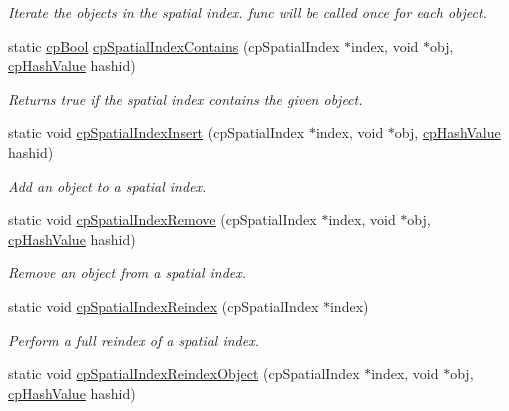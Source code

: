 \begin{DoxyCompactItemize}
\begin{DoxyCompactList}\small\item\em Iterate the objects in the spatial index. {\ttfamily func} will be called once for each object. \end{DoxyCompactList}\item 
static \hyperlink{group__basic_types_gabc5e752c48f3449ca26ef413ecbd647e}{cp\+Bool} \hyperlink{group__cp_spatial_index_gabe87290682030b3de790eb99d515cc37}{cp\+Spatial\+Index\+Contains} (cp\+Spatial\+Index $\ast$index, void $\ast$obj, \hyperlink{group__basic_types_gae7eb4775a9f43914a15553ca65a048f4}{cp\+Hash\+Value} hashid)
\begin{DoxyCompactList}\small\item\em Returns true if the spatial index contains the given object. \end{DoxyCompactList}\item 
static void \hyperlink{group__cp_spatial_index_ga64e1fb8e5d80db41daa3f7a2868f6cf5}{cp\+Spatial\+Index\+Insert} (cp\+Spatial\+Index $\ast$index, void $\ast$obj, \hyperlink{group__basic_types_gae7eb4775a9f43914a15553ca65a048f4}{cp\+Hash\+Value} hashid)
\begin{DoxyCompactList}\small\item\em Add an object to a spatial index. \end{DoxyCompactList}\item 
static void \hyperlink{group__cp_spatial_index_ga3c57a5ea8af5d34ed253a410641eabd2}{cp\+Spatial\+Index\+Remove} (cp\+Spatial\+Index $\ast$index, void $\ast$obj, \hyperlink{group__basic_types_gae7eb4775a9f43914a15553ca65a048f4}{cp\+Hash\+Value} hashid)
\begin{DoxyCompactList}\small\item\em Remove an object from a spatial index. \end{DoxyCompactList}\item 
\hypertarget{group__cp_spatial_index_ga53a63b28ddc23833125af07f50824810}{}static void \hyperlink{group__cp_spatial_index_ga53a63b28ddc23833125af07f50824810}{cp\+Spatial\+Index\+Reindex} (cp\+Spatial\+Index $\ast$index)\label{group__cp_spatial_index_ga53a63b28ddc23833125af07f50824810}

\begin{DoxyCompactList}\small\item\em Perform a full reindex of a spatial index. \end{DoxyCompactList}\item 
\hypertarget{group__cp_spatial_index_ga2e1fdebe1cbc9271a387523f8835d56a}{}static void \hyperlink{group__cp_spatial_index_ga2e1fdebe1cbc9271a387523f8835d56a}{cp\+Spatial\+Index\+Reindex\+Object} (cp\+Spatial\+Index $\ast$index, void $\ast$obj, \hyperlink{group__basic_types_gae7eb4775a9f43914a15553ca65a048f4}{cp\+Hash\+Value} hashid)\label{group__cp_spatial_index_ga2e1fdebe1cbc9271a387523f8835d56a}


\end{DoxyCompactItemize}
